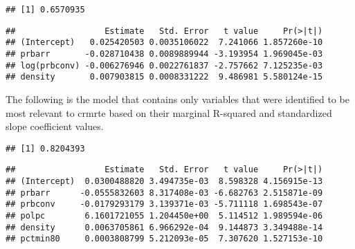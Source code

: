 \documentclass[]{article}
\newenvironment{Shaded}{\begin{snugshade}}{\end{snugshade}}
\newcommand{\KeywordTok}[1]{\textcolor[rgb]{0.13,0.29,0.53}{\textbf{#1}}}
\newcommand{\DataTypeTok}[1]{\textcolor[rgb]{0.13,0.29,0.53}{#1}}
\newcommand{\StringTok}[1]{\textcolor[rgb]{0.31,0.60,0.02}{#1}}
\newcommand{\OperatorTok}[1]{\textcolor[rgb]{0.81,0.36,0.00}{\textbf{#1}}}
\newcommand{\NormalTok}[1]{#1}
\begin{document}
\begin{verbatim}
## [1] 0.6570935
\end{verbatim}

\begin{Shaded}
\end{Shaded}

\begin{verbatim}
##                  Estimate   Std. Error   t value     Pr(>|t|)
## (Intercept)   0.025420503 0.0035106022  7.241066 1.857260e-10
## prbarr       -0.028710438 0.0089889944 -3.193954 1.969045e-03
## log(prbconv) -0.006276946 0.0022761837 -2.757662 7.125235e-03
## density       0.007903815 0.0008331222  9.486981 5.580124e-15
\end{verbatim}

The following is the model that contains only variables that were
identified to be most relevant to crmrte based on their marginal
R-squared and standardized slope coefficient values.

\begin{Shaded}
\end{Shaded}

\begin{verbatim}
## [1] 0.8204393
\end{verbatim}

\begin{Shaded}
\end{Shaded}

\begin{verbatim}
##                  Estimate   Std. Error   t value     Pr(>|t|)
## (Intercept)  0.0300488820 3.494735e-03  8.598328 4.156915e-13
## prbarr      -0.0555832603 8.317408e-03 -6.682763 2.515871e-09
## prbconv     -0.0179293179 3.139371e-03 -5.711118 1.698543e-07
## polpc        6.1601721055 1.204450e+00  5.114512 1.989594e-06
## density      0.0063705861 6.966292e-04  9.144873 3.349488e-14
## pctmin80     0.0003808799 5.212093e-05  7.307620 1.527153e-10
\end{verbatim}
\end{document}
